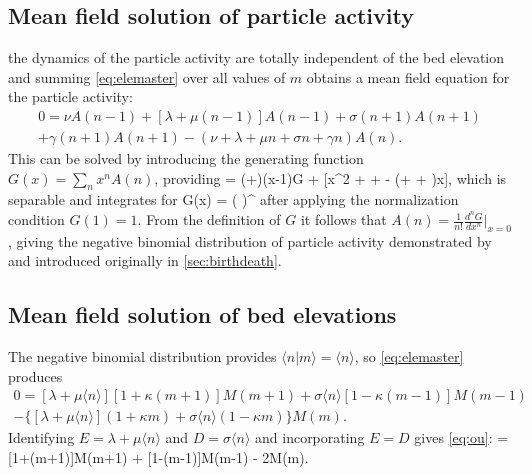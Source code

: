 \subsection{Mean field solution of particle activity}

\DIFdelbegin {}\DIFdelend \DIFaddbegin {}\DIFaddend the dynamics of the particle activity are totally independent of the bed elevation and summing \DIFdelbegin {}\DIFdelend \DIFaddbegin {}\DIFaddend \ref{eq:elemaster} over all values of $m$ obtains a mean field equation for the particle activity: 
\begin{multline} 0 = \nu A(n-1) + [\lambda + \mu(n-1)]A(n-1) + \sigma(n+1)A(n+1) \\
	+\gamma(n+1)A(n+1)-(\nu  + \lambda + \mu n + \sigma n + \gamma n)A(n).\end{multline}
This can be solved by introducing the generating function \citep{Cox1965} $G(x) = \sum_n x^n A(n)$, providing
 = (\nu+\lambda)(x-1)G + [\mu x^2 + \sigma + \gamma - (\mu + \sigma + \gamma)x],\ee
which is separable and integrates for 
\be G(x) = \Bigg( \Bigg)^{\frac{\nu + \lambda}{\mu}}\ee
after applying the normalization condition $G(1)=1$.
From the definition of $G$ it follows that $A(n) = \frac{1}{n!} \frac{d^nG}{dx^n}|_{x=0}$, giving the negative binomial distribution of particle activity demonstrated by \citet{Ancey2008}\DIFdelbegin {}\DIFdelend \DIFaddbegin {}\DIFaddend and introduced originally in \DIFdelbegin {}\DIFdelend \DIFaddbegin {}\DIFaddend \ref{sec:birthdeath}.

\subsection{Mean field solution of bed elevations}
\DIFdelbegin %

\DIFdelend \DIFaddbegin \label{sec:drr}
\DIFaddend The negative binomial distribution provides $\langle n |m \rangle = \langle n \rangle$, so \DIFdelbegin {}\DIFdelend \DIFaddbegin {}\DIFaddend \ref{eq:elemaster} produces
\begin{multline} 0 = [\lambda + \mu \langle n \rangle][1+\kappa(m+1)]M(m+1) + \sigma \langle n \rangle [1-\kappa(m-1)]M(m-1) \\- \{[\lambda + \mu \langle n \rangle](1+\kappa m) + \sigma \langle n \rangle (1-\kappa m) \}M(m). \end{multline}
Identifying $E=\lambda + \mu \langle n \rangle$ and $D = \sigma \langle n \rangle$ and incorporating $E=D$ gives \DIFdelbegin {}\DIFdelend \DIFaddbegin {}\DIFaddend \ref{eq:ou}:
 = [1+\kappa(m+1)]M(m+1) + [1-\kappa(m-1)]M(m-1) - 2M(m).\ee

